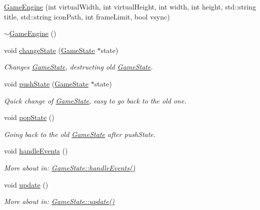 \begin{DoxyCompactItemize}
\item 
\mbox{\hyperlink{class_game_engine_a5365f65c15fa45ab2f6e4e661f6fbd5f}{Game\+Engine}} (int virtual\+Width, int virtual\+Height, int width, int height, std\+::string title, std\+::string icon\+Path, int frame\+Limit, bool vsync)
\item 
\mbox{\hyperlink{class_game_engine_a8e59d8341ef9d2dcc62eee1437e37f14}{$\sim$\+Game\+Engine}} ()
\item 
void \mbox{\hyperlink{class_game_engine_a2a83394496e5c9060b9f8ddb5a7abd24}{change\+State}} (\mbox{\hyperlink{class_game_state}{Game\+State}} $\ast$state)
\begin{DoxyCompactList}\small\item\em Changes \mbox{\hyperlink{class_game_state}{Game\+State}}, destructing old \mbox{\hyperlink{class_game_state}{Game\+State}}. \end{DoxyCompactList}\item 
void \mbox{\hyperlink{class_game_engine_a082e38033f8dc63b2d130a0cfd3fbdd9}{push\+State}} (\mbox{\hyperlink{class_game_state}{Game\+State}} $\ast$state)
\begin{DoxyCompactList}\small\item\em Quick change of \mbox{\hyperlink{class_game_state}{Game\+State}}, easy to go back to the old one. \end{DoxyCompactList}\item 
void \mbox{\hyperlink{class_game_engine_a21d2ebf3778429727595a8b87893314f}{pop\+State}} ()
\begin{DoxyCompactList}\small\item\em Going back to the old \mbox{\hyperlink{class_game_state}{Game\+State}} after push\+State. \end{DoxyCompactList}\item 
void \mbox{\hyperlink{class_game_engine_a15e2e71a499386e3a19bbba361be4377}{handle\+Events}} ()
\begin{DoxyCompactList}\small\item\em More about in\+: \mbox{\hyperlink{class_game_state_a3ef0638514dbfe71581d593cf0f66ce5}{Game\+State\+::handle\+Events()}} \end{DoxyCompactList}\item 
void \mbox{\hyperlink{class_game_engine_ae03241b464040b659b6a91f27920e8c3}{update}} ()
\begin{DoxyCompactList}\small\item\em More about in\+: \mbox{\hyperlink{class_game_state_a66b11afe355a9479f94aaf76576980bd}{Game\+State\+::update()}} \end{DoxyCompactList}\item 

\end{DoxyCompactItemize}
